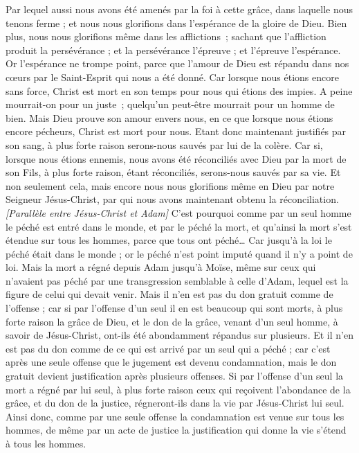 \begin{multicols}{2}
Par lequel aussi nous avons été amenés par la foi à cette grâce, dans laquelle nous tenons ferme ; et nous nous glorifions dans l'espérance de la gloire de Dieu.
Bien plus, nous nous glorifions même dans les afflictions ; sachant que l'affliction produit la persévérance ;
et la persévérance l'épreuve ; et l'épreuve l'espérance.
Or l'espérance ne trompe point, parce que l'amour de Dieu est répandu dans nos cœurs par le Saint-Esprit qui nous a été donné.
Car lorsque nous étions encore sans force, Christ est mort en son temps pour nous qui étions des impies.
A peine mourrait-on pour un juste ; quelqu’un peut-être mourrait pour un homme de bien.
Mais Dieu prouve son amour envers nous, en ce que lorsque nous étions encore pécheurs, Christ est mort pour nous.
Etant donc maintenant justifiés par son sang, à plus forte raison serons-nous sauvés par lui de la colère.
Car si, lorsque nous étions ennemis, nous avons été réconciliés avec Dieu par la mort de son Fils, à plus forte raison, étant réconciliés, serons-nous sauvés par sa vie.
Et non seulement cela, mais encore nous nous glorifions même en Dieu par notre Seigneur Jésus-Christ, par qui nous avons maintenant obtenu la réconciliation.
\textit{[Parallèle entre Jésus-Christ et Adam]}
C'est pourquoi comme par un seul homme le péché est entré dans le monde, et par le péché la mort, et qu’ainsi la mort s’est étendue sur tous les hommes, parce que tous ont péché…
Car jusqu'à la loi le péché était dans le monde ; or le péché n'est point imputé quand il n'y a point de loi.
Mais la mort a régné depuis Adam jusqu'à Moïse, même sur ceux qui n'avaient pas péché par une transgression semblable à celle d’Adam, lequel est la figure de celui qui devait venir.
Mais il n'en est pas du don gratuit comme de l'offense ; car si par l'offense d'un seul il en est beaucoup qui sont morts, à plus forte raison la grâce de Dieu, et le don de la grâce, venant d'un seul homme, à savoir de Jésus-Christ, ont-ils été abondamment répandus sur plusieurs.
Et il n'en est pas du don comme de ce qui est arrivé par un seul qui a péché ; car c’est après une seule offense que le jugement est devenu condamnation, mais le don gratuit devient justification après plusieurs offenses.
Si par l'offense d'un seul la mort a régné par lui seul, à plus forte raison ceux qui reçoivent l'abondance de la grâce, et du don de la justice, régneront-ils dans la vie par Jésus-Christ lui seul.
Ainsi donc, comme par une seule offense la condamnation est venue sur tous les hommes, de même par un acte de justice la justification qui donne la vie s’étend à tous les hommes.

\end{multicols}
